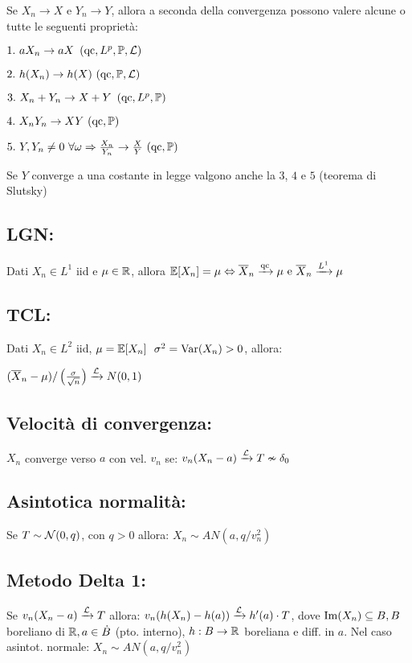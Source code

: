 Se $X_n\rightarrow X$ e $Y_n\rightarrow Y$, allora a seconda della convergenza possono valere alcune o tutte le seguenti proprietà:

$1.\ aX_n\rightarrow aX\ \left(\text{qc} ,L^p ,\mathbb P ,\mathcal L\right)$

$2.\ h( X_n)\rightarrow h(X)\ (\text{qc} ,\mathbb P ,\mathcal L )$

$3.\ X_n +Y_n\rightarrow X+Y\ \left(\text{qc} ,L^p ,\PP\right)$

$4.\ X_n Y_n\rightarrow XY\ (\text{qc} ,\mathbb P )$

$5.\ Y,Y_n \neq 0\ \forall \omega \Rightarrow \frac{X_n}{Y_n}\rightarrow \frac{X}{Y} \ (\text{qc} ,\mathbb P )$

Se $Y$ converge a una costante in legge valgono anche la $3$, $4$ e $5$ (teorema di Slutsky)
\subsection{LGN:}

Dati $X_n \in L^1$ iid e $\mu \in \mathbb R$, allora $\mathbb E[ X_n] =\mu \Leftrightarrow \overline{X}_n\xrightarrow{\text{qc}} \mu \text{ e }\overline{X}_n\xrightarrow{L^1} \mu $
\subsection{TCL:}

Dati $X_n \in L^2$ iid, $\mu =\mathbb E[ X_n] \ \ \sigma^2 =\operatorname{Var}(X_n) >0$, allora:

$(\overline{X}_n -\mu ) /\left(\frac{\sigma}{\sqrt{n}}\right)\xrightarrow{\mathcal L} N (0,1)$
\subsection{Velocità di convergenza:}

$X_n$ converge verso $a$ con vel. $v_n$ se: $v_n( X_n -a)\xrightarrow{\mathcal L} T\nsim \delta_0$
\subsection{Asintotica normalità:}

Se $T\sim \mathcal N (0,q)$, con $q >0$ allora: $X_n \sim AN\left( a,q/v^2_n\right)$
\subsection{Metodo Delta 1:}

Se $v_n( X_n -a)\xrightarrow{\mathcal L} T$ allora: $v_n( h( X_n) -h(a))\xrightarrow{\mathcal L} h'(a)\cdot T$, dove $\operatorname{Im}( X_n) \subseteq B,B$ boreliano di $\mathbb R ,a\in \dot{B}$ (pto. interno), $h:B\rightarrow \mathbb R$ boreliana e diff. in $a$. Nel caso asintot. normale: $X_n \sim AN\left( a,q/v^2_n\right)$

